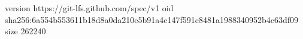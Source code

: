 version https://git-lfs.github.com/spec/v1
oid sha256:6a554b553611b18d8a0da210e5b91a4c147f591c8481a1988340952b4c63df09
size 262240
